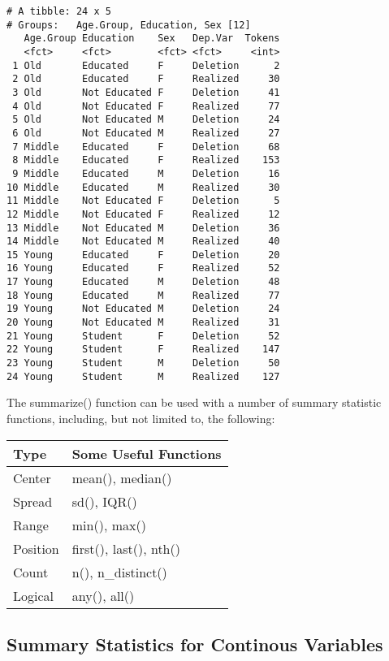 \documentclass[
  12pt,
  letterpaper]{article}
\renewcommand\texttt[1]{{\ttfamily\color{BrickRed}#1}}
\begin{document}
\begin{verbatim}
# A tibble: 24 x 5
# Groups:   Age.Group, Education, Sex [12]
   Age.Group Education    Sex   Dep.Var  Tokens
   <fct>     <fct>        <fct> <fct>     <int>
 1 Old       Educated     F     Deletion      2
 2 Old       Educated     F     Realized     30
 3 Old       Not Educated F     Deletion     41
 4 Old       Not Educated F     Realized     77
 5 Old       Not Educated M     Deletion     24
 6 Old       Not Educated M     Realized     27
 7 Middle    Educated     F     Deletion     68
 8 Middle    Educated     F     Realized    153
 9 Middle    Educated     M     Deletion     16
10 Middle    Educated     M     Realized     30
11 Middle    Not Educated F     Deletion      5
12 Middle    Not Educated F     Realized     12
13 Middle    Not Educated M     Deletion     36
14 Middle    Not Educated M     Realized     40
15 Young     Educated     F     Deletion     20
16 Young     Educated     F     Realized     52
17 Young     Educated     M     Deletion     48
18 Young     Educated     M     Realized     77
19 Young     Not Educated M     Deletion     24
20 Young     Not Educated M     Realized     31
21 Young     Student      F     Deletion     52
22 Young     Student      F     Realized    147
23 Young     Student      M     Deletion     50
24 Young     Student      M     Realized    127
\end{verbatim}

The \texttt{summarize()} function can be used with a number of summary
statistic functions, including, but not limited to, the following:

\begin{longtable}[]{@{}ll@{}}
\toprule()
Type & Some Useful Functions \\
\midrule()
\endhead
Center & \texttt{mean()}, \texttt{median()} \\
Spread & \texttt{sd()}, \texttt{IQR()} \\
Range & \texttt{min()}, \texttt{max()} \\
Position & \texttt{first()}, \texttt{last()}, \texttt{nth()} \\
Count & \texttt{n()}, \texttt{n\_distinct()} \\
Logical & \texttt{any()}, \texttt{all()} \\
\bottomrule()
\end{longtable}

\hypertarget{summary-statistics-for-continous-variables}{%
\subsection{Summary Statistics for Continous
Variables}\label{summary-statistics-for-continous-variables}}
\end{document}
